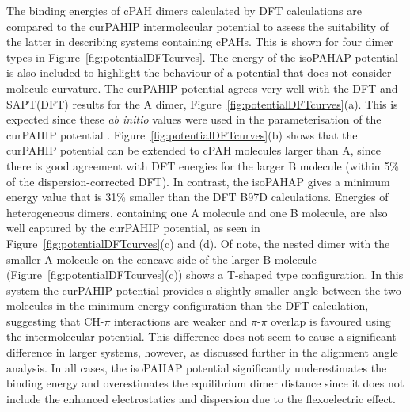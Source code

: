 The binding energies of cPAH dimers calculated by DFT calculations are compared to the curPAHIP intermolecular potential to assess the suitability of the latter in describing systems containing cPAHs.  This is shown for four dimer types in Figure~\ref{fig:potentialDFTcurves}.  The energy of the isoPAHAP potential is also included to highlight the behaviour of a potential that does not consider molecule curvature.
The curPAHIP potential agrees very well with the DFT and SAPT(DFT) results for the A dimer, Figure~\ref{fig:potentialDFTcurves}(a). This is expected since these \textit{ab initio} values were used in the parameterisation of the curPAHIP potential \cite{bowal2019ion}. 
Figure~\ref{fig:potentialDFTcurves}(b) shows that the curPAHIP potential can be extended to cPAH molecules larger than A, since there is good agreement with DFT energies for the larger B molecule (within 5\% of the dispersion-corrected DFT). In contrast, the isoPAHAP gives a minimum energy value that is 31\% smaller than the DFT B97D calculations.
Energies of heterogeneous dimers, containing one A molecule and one B molecule, are also well captured by the curPAHIP potential, as seen in Figure~\ref{fig:potentialDFTcurves}(c) and (d).  Of note, the nested dimer with the smaller A molecule on the concave side of the larger B molecule (Figure~\ref{fig:potentialDFTcurves}(c)) shows a T-shaped type configuration. In this system the curPAHIP potential provides a slightly smaller %
angle between the two molecules in the minimum energy configuration than the DFT calculation, suggesting that CH-$\pi$ interactions are weaker and $\pi$-$\pi$ overlap is favoured using the intermolecular potential.  This difference does not seem to cause a significant difference in larger systems, however, as discussed further in the alignment angle analysis. %
In all cases, the isoPAHAP potential significantly underestimates the binding energy and overestimates the equilibrium dimer distance since it does not include the enhanced electrostatics and dispersion due to the flexoelectric effect.

